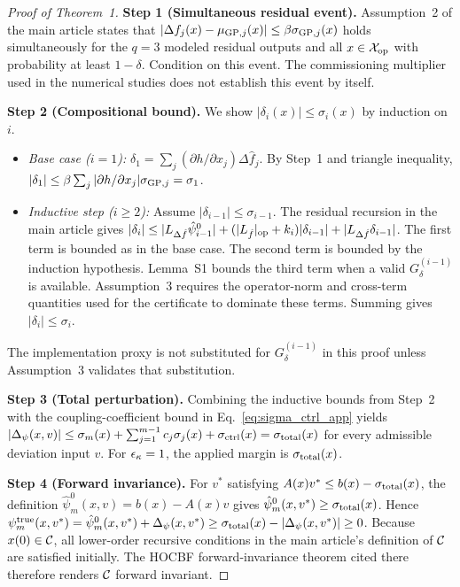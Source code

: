 \begin{proof}[Proof of Theorem~1]
\textbf{Step 1 (Simultaneous residual event).} Assumption~2 of the main article states that $|\Delta f_j(x)-\mu_{\mathrm{GP},j}(x)|\leq\beta\sigma_{\mathrm{GP},j}(x)$ holds simultaneously for the $q=3$ modeled residual outputs and all $x\in\mathcal{X}_{\mathrm{op}}$ with probability at least $1-\delta$. Condition on this event. The commissioning multiplier used in the numerical studies does not establish this event by itself.

\textbf{Step 2 (Compositional bound).} We show $|\delta_i(x)| \leq \sigma_i(x)$ by induction on $i$.
\begin{itemize}
    \item \emph{Base case ($i=1$):} $\delta_1 = \sum_j (\partial h/\partial x_j) \Delta \hat{f}_j$. By Step~1 and triangle inequality, $|\delta_1| \leq \beta \sum_j |\partial h/\partial x_j| \sigma_{\mathrm{GP},j} = \sigma_1$.
    \item \emph{Inductive step ($i \geq 2$):} Assume $|\delta_{i-1}| \leq \sigma_{i-1}$. The residual recursion in the main article gives $|\delta_i| \leq |L_{\Delta \hat{f}} \hat{\psi}_{i-1}^0| + (|L_{\hat{f}}|_{\mathrm{op}} + k_i)|\delta_{i-1}| + |L_{\Delta \hat{f}} \delta_{i-1}|$. The first term is bounded as in the base case. The second term is bounded by the induction hypothesis. Lemma~S1 bounds the third term when a valid $G_\delta^{(i-1)}$ is available. Assumption~3 requires the operator-norm and cross-term quantities used for the certificate to dominate these terms. Summing gives $|\delta_i| \leq \sigma_i$.
\end{itemize}
The implementation proxy is not substituted for $G_\delta^{(i-1)}$ in this proof unless Assumption~3 validates that substitution.

\textbf{Step 3 (Total perturbation).} Combining the inductive bounds from Step~2 with the coupling-coefficient bound in Eq.~\eqref{eq:sigma_ctrl_app} yields $|\Delta_{\psi}(x,v)| \leq \sigma_m(x) + \sum_{j=1}^{m-1} c_j \sigma_j(x) + \sigma_{\mathrm{ctrl}}(x) = \sigma_{\mathrm{total}}(x)$ for every admissible deviation input $v$. For $\epsilon_\kappa = 1$, the applied margin is $\sigma_{\mathrm{total}}(x)$.

\textbf{Step 4 (Forward invariance).} For $v^*$ satisfying $A(x)v^* \leq b(x)-\sigma_{\mathrm{total}}(x)$, the definition $\hat{\psi}_m^0(x,v)=b(x)-A(x)v$ gives $\hat{\psi}_m^0(x,v^*)\geq\sigma_{\mathrm{total}}(x)$. Hence $\psi_m^{\mathrm{true}}(x,v^*) = \hat{\psi}_m^0(x,v^*) + \Delta_{\psi}(x,v^*) \geq \sigma_{\mathrm{total}}(x) - |\Delta_{\psi}(x,v^*)| \geq 0$. Because $x(0)\in\mathcal{C}$, all lower-order recursive conditions in the main article's definition of $\mathcal{C}$ are satisfied initially. The HOCBF forward-invariance theorem cited there therefore renders $\mathcal{C}$ forward invariant.
\end{proof}

